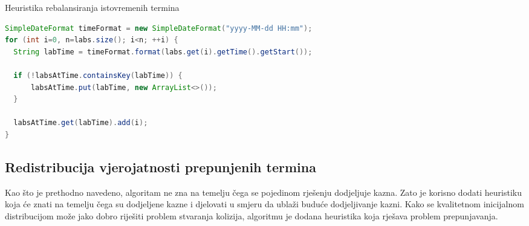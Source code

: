 \documentclass[times, utf8, zavrsni]{fer}
\begin{document}
\begin{algorithm}
  \caption{Heuristika rebalansiranja istovremenih termina}
  \label{algo:rebalans}
  \begin{algorithmic}



      \ENDFOR


      \ENDFOR
    \ENDFOR
  \ENDFOR

  \end{algorithmic}
\end{algorithm}



\begin{lstlisting}[caption={Izrada mape istovremenih termina u programskom jeziku Java},label=code:labsAtTime, language=Java]
SimpleDateFormat timeFormat = new SimpleDateFormat("yyyy-MM-dd HH:mm");
for (int i=0, n=labs.size(); i<n; ++i) {
  String labTime = timeFormat.format(labs.get(i).getTime().getStart());

  if (!labsAtTime.containsKey(labTime)) {
      labsAtTime.put(labTime, new ArrayList<>());
  }

  labsAtTime.get(labTime).add(i);
}
\end{lstlisting}



\subsection{Redistribucija vjerojatnosti prepunjenih termina}
Kao što je prethodno navedeno, algoritam ne zna na temelju čega se pojedinom rješenju dodjeljuje kazna. Zato je korisno dodati
heuristiku koja će znati na temelju čega su dodjeljene kazne i djelovati u smjeru da ublaži buduće dodjeljivanje kazni.
Kako se kvalitetnom inicijalnom distribucijom može jako dobro riješiti problem stvaranja kolizija, algoritmu je dodana heuristika
koja rješava problem prepunjavanja.
\end{document}
